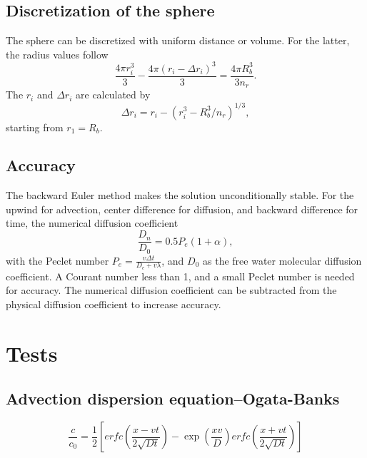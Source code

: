 \documentclass{article}
\begin{document}
\subsection{Discretization of the sphere}
The sphere can be discretized with uniform distance or volume. For the latter, the radius values follow
\begin{equation}
\frac{4\pi r_i^3}{3} - \frac{4\pi (r_i-\Delta r_i)^3}{3} = \frac{4\pi R_b^3}{3n_r}.
\end{equation}
The $r_i$ and $\Delta r_i$ are calculated by
\begin{equation}
\Delta r_i = r_i - (r_i^3 - R_b^3/n_r)^{1/3},
\end{equation}
starting from $r_1 = R_b$.

\subsection{Accuracy}
The backward Euler method makes the solution unconditionally stable.
For the upwind for advection, center difference for diffusion, and backward difference for time, the numerical diffusion coefficient
\begin{equation}
\frac{D_n}{D_0} = 0.5 P_e (1 + \alpha),
\end{equation}
with the Peclet number $P_e=\frac{v \Delta t}{D_e+v\lambda}$, and $D_0$ as the free water molecular diffusion coefficient. A Courant number less than 1, and a small Peclet number is needed for accuracy. The numerical diffusion coefficient can be subtracted from the physical diffusion coefficient to increase accuracy.

\section{Tests}
\subsection{Advection dispersion equation--Ogata-Banks}
\begin{equation}
\frac{c}{c_0} = \frac{1}{2}\left[erfc\left(\frac{x-vt}{2\sqrt{Dt}}\right) - \exp\left(\frac{xv}{D}\right)erfc\left(\frac{x+vt}{2\sqrt{Dt}}\right)\right]
\end{equation}


{}

\end{document}

